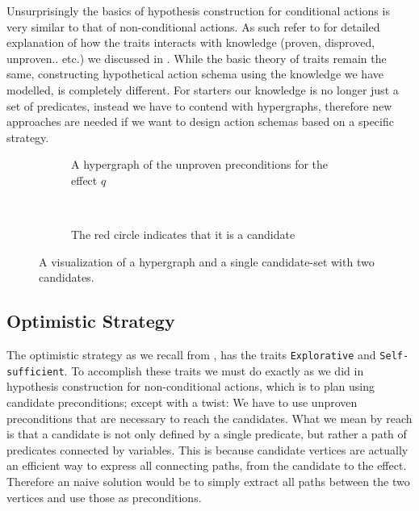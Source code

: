 \documentclass[\master/Master.tex]{subfiles}
\begin{document}
Unsurprisingly the basics of hypothesis construction for conditional actions is very similar to that of non-conditional actions. 
As such refer to  for detailed explanation of how the traits interacts with knowledge (proven, disproved, unproven.. etc.) we discussed in .
While the basic theory of traits remain the same, constructing hypothetical action schema using the knowledge we have modelled, is completely different. For starters our knowledge is no longer just a set of predicates, instead we have to contend with hypergraphs, therefore new approaches are needed if we want to design action schemas based on a specific strategy.


\begin{figure}
	\centering
	\begin{subfigure}{.5\textwidth}
		\centering
		  		
		\caption{\label{fig:ca:hypgraph-with-unproven} A hypergraph of the unproven preconditions for the effect $q$}
	\end{subfigure}%
	~ 
	\begin{subfigure}{.5\textwidth}
		\centering
		  
		
		
		
		\caption{\label{fig:ca:hypgraph-with-cands}The red circle indicates that it is a candidate}
	\end{subfigure}
	\caption{ A visualization of a hypergraph and a single candidate-set with two candidates. }
	\label{fig:ca:two-hypgraphs-one-cands}
\end{figure}

\subsection{Optimistic Strategy}
The optimistic strategy as we recall from , has the traits \texttt{Explorative} and \texttt{Self-sufficient}.
To accomplish these traits we must do exactly as we did in hypothesis construction for non-conditional actions, 
which is to plan using candidate preconditions; except with a twist: 
We have to use unproven preconditions that are necessary to reach the candidates.
What we mean by reach is that a candidate is not only defined by a single predicate, but rather a path of predicates connected by variables.
This is because candidate vertices are actually an efficient way to express all connecting paths, from the candidate to the effect.
Therefore an naive solution would be to simply extract all paths between the two vertices and use those as preconditions.
\end{document}
